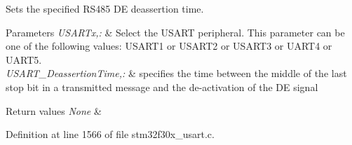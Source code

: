 Sets the specified R\-S485 D\-E deassertion time. 


\begin{DoxyParams}{Parameters}
{\em U\-S\-A\-R\-Tx,\-:} & Select the U\-S\-A\-R\-T peripheral. This parameter can be one of the following values\-: U\-S\-A\-R\-T1 or U\-S\-A\-R\-T2 or U\-S\-A\-R\-T3 or U\-A\-R\-T4 or U\-A\-R\-T5. \\
\hline
{\em U\-S\-A\-R\-T\-\_\-\-Deassertion\-Time,\-:} & specifies the time between the middle of the last stop bit in a transmitted message and the de-\/activation of the D\-E signal \\
\hline
\end{DoxyParams}

\begin{DoxyRetVals}{Return values}
{\em None} & \\
\hline
\end{DoxyRetVals}


Definition at line 1566 of file stm32f30x\-\_\-usart.\-c.

